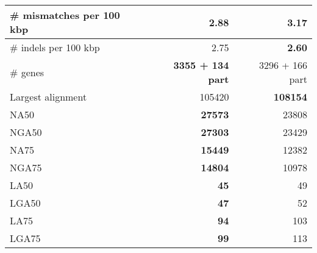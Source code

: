 \documentclass[12pt,a4paper]{article}
\begin{document}
\begin{table}[ht]
\begin{center}
\begin{tabular}{|l*{2}{|r}|}
\# mismatches per 100 kbp & {\bf 2.88} & 3.17 \\ \hline
\# indels per 100 kbp & 2.75 & {\bf 2.60} \\ \hline
\# genes & {\bf 3355 + 134 part} & 3296 + 166 part \\ \hline
Largest alignment & 105420 & {\bf 108154} \\ \hline
NA50 & {\bf 27573} & 23808 \\ \hline
NGA50 & {\bf 27303} & 23429 \\ \hline
NA75 & {\bf 15449} & 12382 \\ \hline
NGA75 & {\bf 14804} & 10978 \\ \hline
LA50 & {\bf 45} & 49 \\ \hline
LGA50 & {\bf 47} & 52 \\ \hline
LA75 & {\bf 94} & 103 \\ \hline
LGA75 & {\bf 99} & 113 \\ \hline
\end{tabular}
\end{center}
\end{table}
\end{document}
